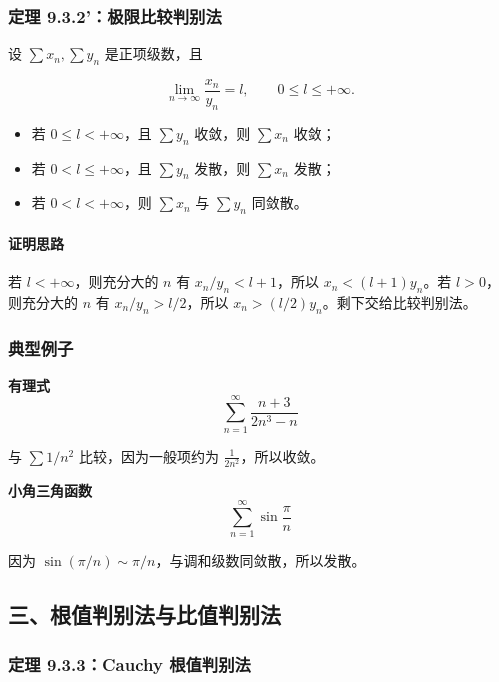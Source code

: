 \subsubsection*{定理 9.3.2'：极限比较判别法}

设 \(\sum x_n,\sum y_n\) 是正项级数，且

\[
      \lim_{n\to\infty}\frac{x_n}{y_n}=l,\qquad 0\le l\le+\infty.
    \]

\begin{itemize}
 \item 若 \(0\le l<+\infty\)，且 \(\sum y_n\) 收敛，则 \(\sum x_n\) 收敛；
 \item 若 \(0<l\le+\infty\)，且 \(\sum y_n\) 发散，则 \(\sum x_n\) 发散；
 \item 若 \(0<l<+\infty\)，则 \(\sum x_n\) 与 \(\sum y_n\) 同敛散。
 \end{itemize}

\paragraph*{证明思路}

若 \(l<+\infty\)，则充分大的 \(n\) 有 \(x_n/y_n<l+1\)，所以 \(x_n<(l+1)y_n\)。若 \(l>0\)，则充分大的 \(n\) 有 \(x_n/y_n>l/2\)，所以 \(x_n>(l/2)y_n\)。剩下交给比较判别法。

\subsubsection*{典型例子}

\begin{conceptbox}
\textbf{有理式}
\[
          \sum_{n=1}^{\infty}\frac{n+3}{2n^3-n}
        \]

与 \(\sum 1/n^2\) 比较，因为一般项约为 \(\frac{1}{2n^2}\)，所以收敛。
\end{conceptbox}

\begin{conceptbox}
\textbf{小角三角函数}
\[
          \sum_{n=1}^{\infty}\sin\frac{\pi}{n}
        \]

因为 \(\sin(\pi/n)\sim \pi/n\)，与调和级数同敛散，所以发散。
\end{conceptbox}

\subsection*{三、根值判别法与比值判别法}

\subsubsection*{定理 9.3.3：Cauchy 根值判别法}

